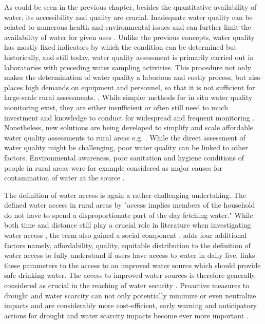As could be seen in the previous chapter, besides the quantitative availability of water, its accessibility and quality are crucial. Inadequate water quality can be related to numerous health and environmental issues and can further limit the availability of water for given uses \autocite{rcrcFORECASTBASEDFINANCINGEARLY2020, faoCopingWaterScarcity2012}. Unlike the previous concepts, water quality has mostly fixed indicators by which the condition can be determined but historically, and still today, water quality assessment is primarily carried out in laboratories with preceding water sampling activities. This procedure not only makes the determination of water quality a laborious and costly process, but also places high demands on equipment and personnel, so that it is not sufficient for large-scale rural assessments. \autocite{tariqOpenSourceWater2021,worldmeteorologicalorganizationPlanningWaterqualityMonitoring2013}. While simpler methods for in situ water quality monitoring exist, they are either insufficient or often still need to much investment and knowledge to conduct for widespread and frequent monitoring \autocite{worldmeteorologicalorganizationPlanningWaterqualityMonitoring2013}. Nonetheless, new solutions are being developed to simplify and scale affordable water quality assessments to rural areas e.g. \autocite{ighaloComprehensiveReviewWater2020,tariqOpenSourceWater2021}. While the direct assessment of water quality might be challenging, poor water quality can be linked to other factors. Environmental awareness, poor sanitation and hygiene conditions of people in rural areas were for example considered as major causes for contamination of water at the source \autocite{zamxakaMicrobiologicalPhysicochemicalAssessment2004}.

The definition of water access is again a rather challenging undertaking. The \autocite[254]{worldbankWorldDevelopmentReport1997} defined water access in rural areas by "access implies members of the household do not have to spend a disproportionate part of the day fetching water." While both time and distance still play a crucial role in literature when investigating water access \autocite{cassiviDrinkingWaterAccessibility2019,cassiviEvaluatingSelfreportedMeasures2021,emenikeAccessingSafeDrinking2017}, the term also gained a social component \autocite{emenikeAccessingSafeDrinking2017,mitlinUnaffordableUndrinkable}. \autocite{obeng-odoomAccessWater2012} adds four additional factors namely, affordability, quality, equitable distribution to the definition of water access to fully understand if users have access to water in daily live. \autocite{unitednations/developmentprogrammeDeepeningDemocracyFragmented2002} links these parameters to the access to an improved water source which should provide safe drinking water.
The access to improved water sources is therefore generally considered as crucial in the reaching of water security \autocite{cdcAssessingAccessWater2022}. Proactive measures to drought and water scarcity can not only potentially minimize or even neutralize impacts and are considerably more cost-efficient, early warning and anticipatory actions for drought and water scarcity impacts become ever more important \autocite{faoandun-waterProgressLevelWater2021,idmpDroughtWaterScarcity2022,worldbankHighDryClimate2016}.

